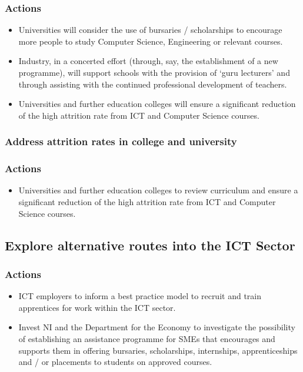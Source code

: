 \subsubsection{Actions}

\begin{itemize}
    \item Universities will consider the use of bursaries / scholarships to encourage more people to study Computer Science, Engineering or relevant courses.
    \item Industry, in a concerted effort (through, say, the establishment of a new programme), will support schools with the provision of ‘guru lecturers’ and through assisting with the continued professional development of teachers.
    \item Universities and further education colleges will ensure a significant reduction of the high attrition rate from ICT and Computer Science courses.
\end{itemize}

\subsubsection{Address attrition rates in college and university}

\subsubsection{Actions}

\begin{itemize}
    \item Universities and further education colleges to review curriculum and ensure a significant reduction of the high attrition rate from ICT and Computer Science courses.
\end{itemize}

\subsection{Explore alternative routes into the ICT Sector}

\subsubsection{Actions}

\begin{itemize}
    \item ICT employers to inform a best practice model to recruit and train apprentices for work within the ICT sector.
    \item Invest NI and the Department for the Economy to investigate the possibility of establishing an assistance programme for SMEs that encourages and supports them in offering bursaries, scholarships, internships, apprenticeships and / or placements to students on approved courses.
\end{itemize}

